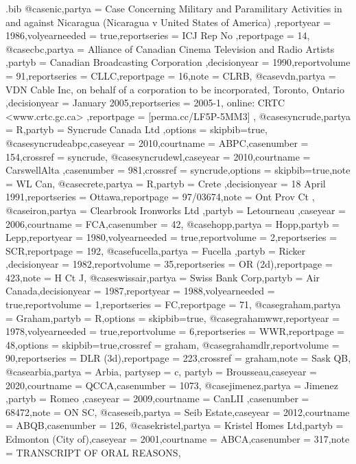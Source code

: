 \begin{filecontents*}[overwrite]{\jobname.bib}
@case{nic,partya = {Case Concerning Military and Paramilitary Activities in and against Nicaragua (Nicaragua v United States of America) },reportyear = {1986},volyearneeded = {true},reportseries = {ICJ Rep No },reportpage = {14},}
@case{cbc,partya = {Alliance of Canadian Cinema Television and Radio Artists },partyb = {Canadian Broadcasting Corporation },decisionyear = {1990},reportvolume = {91},reportseries = {CLLC},reportpage = {16},note = {CLRB},}
@case{vdn,partya = {VDN Cable Inc, on behalf of a corporation to be incorporated, Toronto, Ontario },decisionyear = {January 2005},reportseries = {2005-1, online: CRTC <www.crtc.gc.ca> },reportpage = {[perma.cc/LF5P-5MM3] },}
@case{syncrude,partya = {R},partyb = {Syncrude Canada Ltd },options = {skipbib=true},}
@case{syncrudeabpc,caseyear = {2010},courtname = {ABPC},casenumber = {154},crossref = {syncrude},}
@case{syncrudewl,caseyear = {2010},courtname = {CarswellAlta },casenumber = {981},crossref = {syncrude},options = {skipbib=true},note = {WL Can},}
@case{crete,partya = {R},partyb = {Crete },decisionyear = {18 April 1991},reportseries = {Ottawa},reportpage = {97/03674},note = {Ont Prov Ct },}
@case{iron,partya = {Clearbrook Ironworks Ltd },partyb = {Letourneau },caseyear = {2006},courtname = {FCA},casenumber = {42},}
@case{hopp,partya = {Hopp},partyb = {Lepp},reportyear = {1980},volyearneeded = {true},reportvolume = {2},reportseries = {SCR},reportpage = {192},}
@case{fucella,partya = {Fucella },partyb = {Ricker },decisionyear = {1982},reportvolume = {35},reportseries = {OR (2d)},reportpage = {423},note = {H Ct J},}
@case{swissair,partya = {Swiss Bank Corp},partyb = {Air Canada},decisionyear = {1987},reportyear = {1988},volyearneeded = {true},reportvolume = {1},reportseries = {FC},reportpage = {71},}
@case{graham,partya = {Graham},partyb = {R},options = {skipbib=true},}
@case{grahamwwr,reportyear = {1978},volyearneeded = {true},reportvolume = {6},reportseries = {WWR},reportpage = {48},options = {skipbib=true},crossref = {graham},}
@case{grahamdlr,reportvolume = {90},reportseries = {DLR (3d)},reportpage = {223},crossref = {graham},note = {Sask QB},}
@case{arbia,partya = {Arbia},
partysep = {c},
partyb = {Brousseau},caseyear = {2020},courtname = {QCCA},casenumber = {1073},}
@case{jimenez,partya = {Jimenez },partyb = {Romeo },caseyear = {2009},courtname = {CanLII },casenumber = {68472},note = {ON SC},}
@case{seib,partya = {Seib Estate},caseyear = {2012},courtname = {ABQB},casenumber = {126},}
@case{kristel,partya = {Kristel Homes Ltd},partyb = {Edmonton (City of)},caseyear = {2001},courtname = {ABCA},casenumber = {317},note = {TRANSCRIPT OF ORAL REASONS},}

\end{filecontents*}
